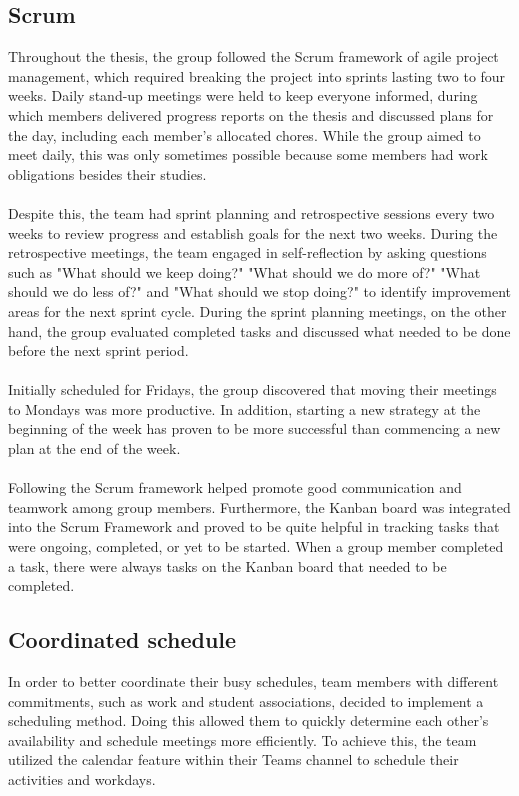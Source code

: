 \subsection{Scrum}
Throughout the thesis, the group followed the Scrum framework of agile project management, which required breaking the project into sprints lasting two to four weeks. Daily stand-up meetings were held to keep everyone informed, during which members delivered progress reports on the thesis and discussed plans for the day, including each member's allocated chores. While the group aimed to meet daily, this was only sometimes possible because some members had work obligations besides their studies.
\\~\\
Despite this, the team had sprint planning and retrospective sessions every two weeks to review progress and establish goals for the next two weeks. During the retrospective meetings, the team engaged in self-reflection by asking questions such as "What should we keep doing?" "What should we do more of?" "What should we do less of?" and "What should we stop doing?" to identify improvement areas for the next sprint cycle. During the sprint planning meetings, on the other hand, the group evaluated completed tasks and discussed what needed to be done before the next sprint period.
\\~\\
Initially scheduled for Fridays, the group discovered that moving their meetings to Mondays was more productive. In addition, starting a new strategy at the beginning of the week has proven to be more successful than commencing a new plan at the end of the week.
\\~\\
Following the Scrum framework helped promote good communication and teamwork among group members. Furthermore, the Kanban board was integrated into the Scrum Framework and proved to be quite helpful in tracking tasks that were ongoing, completed, or yet to be started. When a group member completed a task, there were always tasks on the Kanban board that needed to be completed. 

\subsection{Coordinated schedule}
In order to better coordinate their busy schedules, team members with different commitments, such as work and student associations, decided to implement a scheduling method. Doing this allowed them to quickly determine each other's availability and schedule meetings more efficiently. To achieve this, the team utilized the calendar feature within their Teams channel to schedule their activities and workdays.

